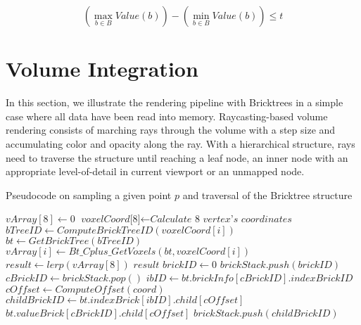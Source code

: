 \begin{equation} \label{eq:collapse_thresh}
\left(\max_{b \in B} Value(b)\right) - \left(\min_{b \in B} Value(b)\right) \leq t
\end{equation}



\section{Volume Integration}
In this section, we illustrate the rendering pipeline with Bricktrees in a
simple case where all data have been read into memory.  
Raycasting-based volume rendering consists of marching rays through the volume with
a step size and accumulating color and opacity along the ray. With a hierarchical
structure, rays need to traverse the structure until reaching a leaf node, an inner
node with an appropriate level-of-detail in current viewport or an unmapped node. 


\begin{algorithm}
	\caption{Pseudocode on sampling a given point $p$ and traversal of the Bricktree structure }\label{alg:sample}
	\begin{algorithmic}[1]
        	\State $vArray[8]\gets \textit{0}$
            \State $\textit{voxelCoord[8]} \gets \textit{Calculate 8 vertex's coordinates}$
            	\State $bTreeID \gets ComputeBrickTreeID(voxelCoord[i])$
                \State $bt \gets GetBrickTree(bTreeID)$
            	\State $vArray[i] \gets Bt\_Cplus\_GetVoxels(bt,voxelCoord[i])$
            \EndWhile
            \State $result \gets lerp(vArray[8])$
            \State \Return $result$
    	\EndFunction
        	\State $brickID\gets \textit{0}$
            \State $brickStack.push(brickID)$
            	\State $cBrickID \gets brickStack.pop()$
                \State $ibID \gets bt.brickInfo[cBrickID].indexBrickID$
            	\State $cOffset \gets ComputeOffset(coord)$
                \State $childBrickID \gets bt.indexBrick[ibID].child[cOffset]$
                	\State \Return $bt.valueBrick[cBrickID].child[cOffset]$
                \Else
                	\State $brickStack.push(childBrickID)$
                \EndIf
            \EndWhile
    	\EndFunction
	\end{algorithmic}
\end{algorithm}

